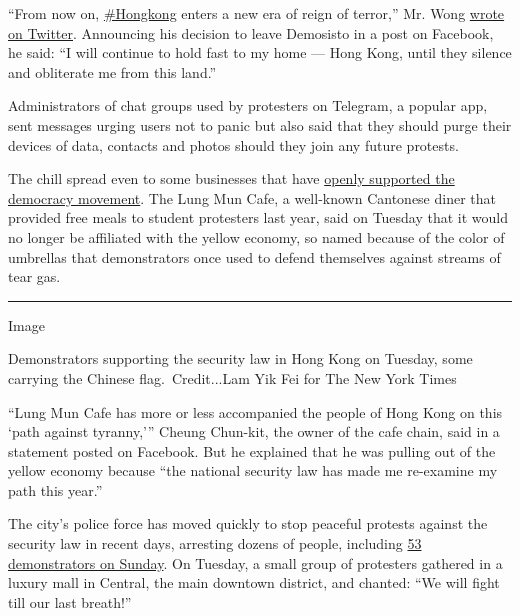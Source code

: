 ``From now on,
\href{https://twitter.com/hashtag/Hongkong?ref_src=twsrc\%5Etfw\%7Ctwcamp\%5Etweetembed\%7Ctwterm\%5E1277794270393643008\%7Ctwgr\%5E\&ref_url=https\%3A\%2F\%2Fscoop.nyt.net\%2Fui\%2Foakarticle\%2F100000007213051\%2Fweb\%2FdqV1egMG0LchnIJbEkRn\&src=hashtag_click}{\#Hongkong}
enters a new era of reign of terror,'' Mr. Wong
\href{https://twitter.com/joshuawongcf/status/1277794270393643008}{wrote
on Twitter}. Announcing his decision to leave Demosisto in a post on
Facebook, he said: ``I will continue to hold fast to my home --- Hong
Kong, until they silence and obliterate me from this land.''

Administrators of chat groups used by protesters on Telegram, a popular
app, sent messages urging users not to panic but also said that they
should purge their devices of data, contacts and photos should they join
any future protests.

The chill spread even to some businesses that have
\href{https://www.nytimes.com/2020/01/19/world/asia/hong-kong-protests-yellow-blue.html}{openly
supported the democracy movement}. The Lung Mun Cafe, a well-known
Cantonese diner that provided free meals to student protesters last
year, said on Tuesday that it would no longer be affiliated with the
yellow economy, so named because of the color of umbrellas that
demonstrators once used to defend themselves against streams of tear
gas.

\begin{center}\rule{0.5\linewidth}{\linethickness}\end{center}

Image

Demonstrators supporting the security law in Hong Kong on Tuesday, some
carrying the Chinese flag.~Credit...Lam Yik Fei for The New York Times

``Lung Mun Cafe has more or less accompanied the people of Hong Kong on
this `path against tyranny,''' Cheung Chun-kit, the owner of the cafe
chain, said in a statement posted on Facebook. But he explained that he
was pulling out of the yellow economy because ``the national security
law has made me re-examine my path this year.''

The city's police force has moved quickly to stop peaceful protests
against the security law in recent days, arresting dozens of people,
including
\href{https://news.rthk.hk/rthk/en/component/k2/1534552-20200628.htm}{53
demonstrators on Sunday}. On Tuesday, a small group of protesters
gathered in a luxury mall in Central, the main downtown district, and
chanted: ``We will fight till our last breath!''

